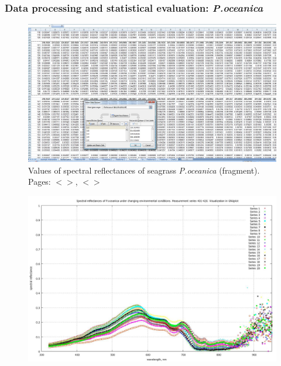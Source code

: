 \documentclass[11pt]{article}
\begin{document}
\begin{appendices}

\subsubsection[Data processing and statistical evaluation: \textit{P.oceanica}]{Data processing and statistical evaluation: \textit{P.oceanica}}
\begin{figure}[H]
	\begin{center}
		\includegraphics[scale=0.20]{App-1.jpg}
		\caption{Values of spectral reflectances of seagrass \textit{P.oceanica} (fragment). Pages: $<$\pageref{dataprep}$>$, $<$\pageref{page-40}$>$}
		\label{fig:A.11}
	\end{center}
\end{figure}
\begin{figure}[H]
	\begin{center}
		\includegraphics[scale=0.25]{GNU-401-420.jpg}

\end{center}
\end{figure}
\end{appendices}
\end{document}
